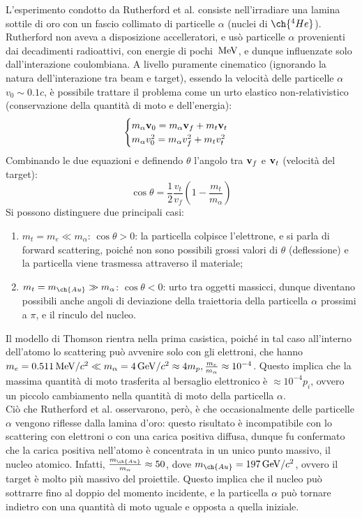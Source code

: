 L'esperimento condotto da Rutherford et al. consiste nell'irradiare una lamina sottile di oro con un fascio collimato di particelle $ \alpha $ (nuclei di $ \ch{^{4} He} $). Rutherford non aveva a disposizione accelleratori, e usò particelle $\alpha$ provenienti dai decadimenti radioattivi, con energie di pochi $ \,\mathrm{MeV} $, e dunque influenzate solo dall'interazione coulombiana. A livello puramente cinematico (ignorando la natura dell'interazione tra beam e target), essendo la velocità delle particelle $ \alpha $ $ v_0 \sim 0.1c $, è possibile trattare il problema come un urto elastico non-relativistico (conservazione della quantità di moto e dell'energia):
\begin{equation}
	\begin{cases}
	  m_{\alpha} \mathbf{v}_0 = m_{\alpha} \mathbf{v}_f + m_t \mathbf{v}_t \\
	  m_{\alpha} v_0^2 = m_{\alpha} v_f^2 + m_t v_t^2 \\
	\end{cases}
	\label{eq:2}
\end{equation}
Combinando le due equazioni e definendo $ \theta $ l'angolo tra $ \mathbf{v}_f $ e $ \mathbf{v}_t $ (velocità del target):
\begin{equation}
	\cos \theta = \frac{1}{2} \frac{v_t}{v_f} \left(1 - \frac{m_t}{m_{\alpha}}\right)
	\label{eq:3}
\end{equation}
Si possono distinguere due principali casi:
\begin{enumerate}
	\item $ m_t = m_e \ll m_{\alpha} $: $ \cos \theta > 0 $: la particella colpisce l'elettrone, e si parla di forward scattering, poiché non sono possibili grossi valori di $ \theta $ (deflessione) e la particella viene trasmessa attraverso il materiale;
	\item $ m_t = m_{\ch{Au}} \gg m_{\alpha} $: $ \cos \theta < 0 $: urto tra oggetti massicci, dunque diventano possibili anche angoli di deviazione della traiettoria della particella $\alpha$ prossimi a $ \pi $, e il rinculo del nucleo.
\end{enumerate}
Il modello di Thomson rientra nella prima casistica, poiché in tal caso all'interno dell'atomo lo scattering può avvenire solo con gli elettroni, che hanno $ m_e = 0.511 \,\mathrm{MeV}/c^2 \ll m_{\alpha} = 4 \,\mathrm{GeV}/c^2 \approx 4m_p , \frac{m_e}{m_{\alpha}} \approx 10^{-4} $. Questo implica che la massima quantità di moto trasferita al bersaglio elettronico è $\approx 10^{-4} p_i$, ovvero un piccolo cambiamento nella quantità di moto della particella $\alpha$.\\
Ciò che Rutherford et al. osservarono, però, è che occasionalmente delle particelle $ \alpha $ vengono riflesse dalla lamina d'oro: questo risultato è incompatibile con lo scattering con elettroni o con una carica positiva diffusa, dunque fu confermato che la carica positiva nell'atomo è concentrata in un unico punto massivo, il nucleo atomico. Infatti, $\frac{m_{\ch{Au}}}{m_{\alpha}}\approx 50$, dove $m_{\ch{Au}}=197 \gev/c^2$, ovvero il target è molto più massivo del proiettile. Questo implica che il nucleo può sottrarre fino al doppio del momento incidente, e la particella $\alpha$ può tornare indietro con una quantità di moto uguale e opposta a quella iniziale.

